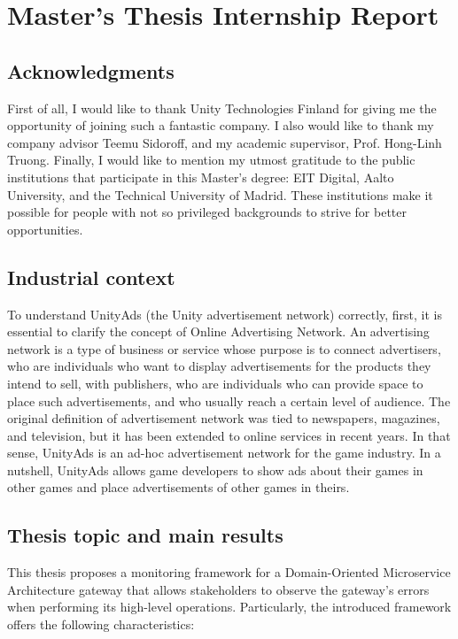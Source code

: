 \documentclass[12pt]{article}
\begin{document}
\clearpage
\section{Master's Thesis Internship Report}

\subsection{Acknowledgments}

First of all, I would like to thank Unity Technologies Finland for giving me the opportunity of joining such a fantastic company. I also would like to thank my company advisor Teemu Sidoroff, and my academic supervisor, Prof. Hong-Linh Truong. Finally, I would like to mention my utmost gratitude to the public institutions that participate in this Master's degree: EIT Digital, Aalto University, and the Technical University of Madrid. These institutions make it possible for people with not so privileged backgrounds to strive for better opportunities.

\subsection{Industrial context}

To understand UnityAds (the Unity advertisement network) correctly, first, it is essential to clarify the concept of Online Advertising Network. An advertising network is a type of business or service whose purpose is to connect advertisers, who are individuals who want to display advertisements for the products they intend to sell, with publishers, who are individuals who can provide space to place such advertisements, and who usually reach a certain level of audience. The original definition of advertisement network was tied to newspapers, magazines, and television, but it has been extended to online services in recent years. In that sense, UnityAds is an ad-hoc advertisement network for the game industry. In a nutshell, UnityAds allows game developers to show ads about their games in other games and place advertisements of other games in theirs.

\subsection{Thesis topic and main results}

This thesis proposes a monitoring framework for a Domain-Oriented Microservice Architecture gateway that allows stakeholders to observe the gateway's errors when performing its high-level operations. Particularly, the introduced framework offers the following characteristics:
\end{document}
